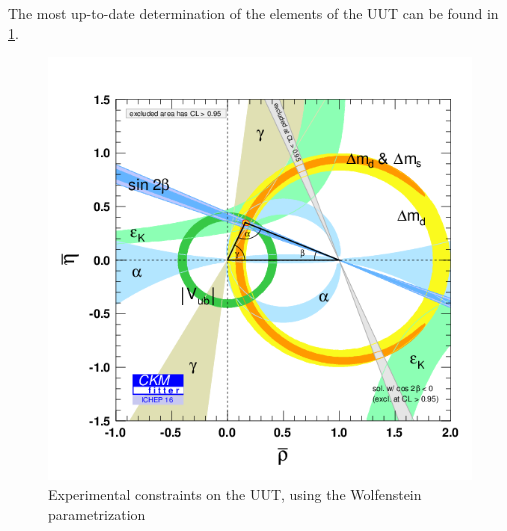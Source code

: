 The most up-to-date determination of the elements of the UUT can be found in \ref{fig:uutEXP}. 
\begin{figure} [htb!]
\begin{center}
\includegraphics[scale=0.5]{figs/uut_CKMFitter.png}
\caption{Experimental constraints on the UUT, using the Wolfenstein parametrization ~\cite{CKMFitter}\label{fig:uutEXP}}
\end{center}
\end{figure}

